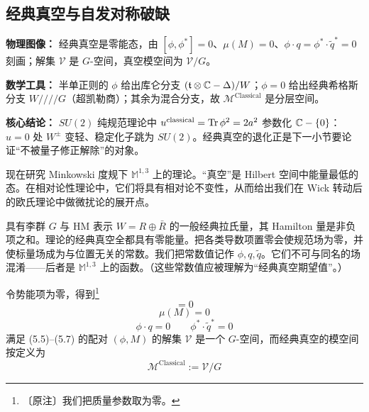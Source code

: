 \subsection{经典真空与自发对称破缺}

\begin{keytakeaways}
\item \textbf{物理图像：} 经典真空是零能态，由 $[\phi,\phi^{*}]=0$、$\mu(M)=0$、$\phi\cdot q=\phi^{*}\cdot\tilde q^{*}=0$ 刻画；解集 $\mathcal{V}$ 是 $G$-空间，真空模空间为 $\mathcal{V}/G$。
\item \textbf{数学工具：} 半单正则的 $\phi$ 给出库仑分支 $(\mathfrak{t}\otimes\mathbb{C}-\Delta)/W$；$\phi=0$ 给出经典希格斯分支 $W/\!/\!/\!/G$（超凯勒商）；其余为混合分支，故 $\mathcal{M}^{\text{Classical}}$ 是分层空间。
\item \textbf{核心结论：} $SU(2)$ 纯规范理论中 $u^{\text{classical}}=\operatorname{Tr}\phi^{2}=2a^{2}$ 参数化 $\mathbb{C}-\{0\}$：$u=0$ 处 $W^{\pm}$ 变轻、稳定化子跳为 $SU(2)$。经典真空的退化正是下一小节要论证“不被量子修正解除”的对象。
\end{keytakeaways}

现在研究 Minkowski 度规下 $\mathbb{M}^{1,3}$ 上的理论。“真空”是 Hilbert 空间中能量最低的态。在相对论性理论中，它们将具有相对论不变性，从而给出我们在 Wick 转动后的欧氏理论中做微扰论的展开点。

具有李群 $G$ 与 HM 表示 $W=R\oplus\bar R$ 的一般经典拉氏量，其 Hamilton 量是非负项之和。理论的经典真空全都具有零能量。把各类导数项置零会使规范场为零，并使标量场成为与位置无关的常数。我们把常数值记作 $\phi,q,\tilde q$。它们不可与同名的场混淆——后者是 $\mathbb{M}^{1,3}$ 上的函数。（这些常数值应被理解为“经典真空期望值”。）

令势能项为零，得到\footnote{〔原注〕我们把质量参数取为零。}
\begin{equation}
[\phi,\phi^{*}]=0
\tag{5.5}
\end{equation}
\begin{equation}
\mu(M)=0
\tag{5.6}
\end{equation}
\begin{equation}
\phi\cdot q=0\qquad \phi^{*}\cdot\tilde q^{*}=0
\tag{5.7}
\end{equation}
满足 (5.5)--(5.7) 的配对 $(\phi,M)$ 的解集 $\mathcal{V}$ 是一个 $G$-空间，而经典真空的模空间按定义为
\begin{equation}
\mathcal{M}^{\text{Classical}}:=\mathcal{V}/G
\tag{5.8}
\end{equation}


